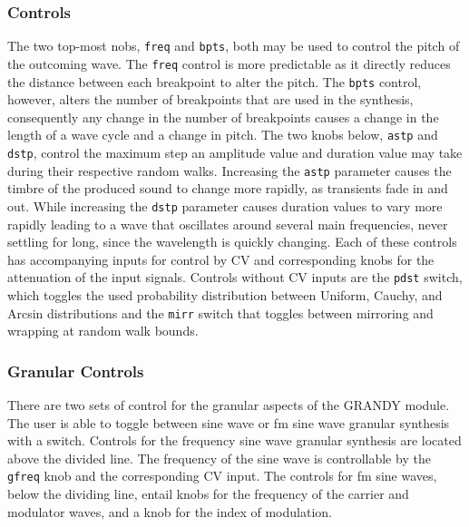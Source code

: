 \documentclass[10pt]{article}
\begin{document}
\subsubsection{Controls}
The two top-most nobs, \texttt{freq} and \texttt{bpts}, both may be used to control the pitch of the outcoming wave. The \texttt{freq} control is more predictable as it directly reduces the distance between each breakpoint to alter the pitch. The \texttt{bpts} control, however, alters the number of breakpoints that are used in the synthesis, consequently any change in the number of breakpoints causes a change in the length of a wave cycle and a change in pitch. The two knobs below, \texttt{astp} and \texttt{dstp}, control the maximum step an amplitude value and duration value may take during their respective random walks. Increasing the \texttt{astp} parameter causes the timbre of the produced sound to change more rapidly, as transients fade in and out. While increasing the \texttt{dstp} parameter causes duration values to vary more rapidly leading to a wave that oscillates around several main frequencies, never settling for long, since the wavelength is quickly changing. Each of these controls has accompanying inputs for control by CV and corresponding knobs for the attenuation of the input signals. Controls without CV inputs are the \texttt{pdst} switch, which toggles the used probability distribution between Uniform, Cauchy, and Arcsin distributions and the \texttt{mirr} switch that toggles between mirroring and wrapping at random walk bounds.

\subsubsection{Granular Controls}
There are two sets of control for the granular aspects of the GRANDY module. The user is able to toggle between sine wave or fm sine wave granular synthesis with a switch. Controls for the frequency sine wave granular synthesis are located above the divided line. The frequency of the sine wave is controllable by the \texttt{gfreq} knob and the corresponding CV input. The controls for fm sine waves, below the dividing line, entail knobs for the frequency of the carrier and modulator waves, and a knob for the index of modulation. 
\end{document}
